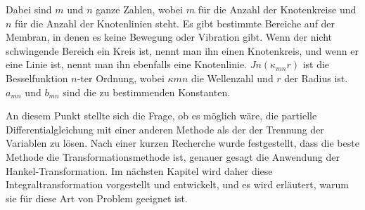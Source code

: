 Dabei sind $m$ und $n$ ganze Zahlen, wobei $m$ für die Anzahl der Knotenkreise und $n$
für die Anzahl der Knotenlinien steht. Es gibt bestimmte Bereiche auf der Membran, in denen es keine Bewegung oder Vibration gibt. Wenn der nicht schwingende Bereich ein Kreis ist, nennt man ihn einen Knotenkreis, und wenn er eine Linie ist, nennt man ihn ebenfalls eine Knotenlinie. $Jn(\kappa_{mn}r)$ ist die Besselfunktion $n$-ter Ordnung, wobei $\kappa mn$ die Wellenzahl und $r$ der Radius ist. $a_{mn}$ und $b_{mn}$ sind die zu bestimmenden Konstanten.


An diesem Punkt stellte sich die Frage, ob es möglich wäre, die partielle Differentialgleichung mit einer anderen Methode als der der Trennung der Variablen zu lösen. Nach einer kurzen Recherche wurde festgestellt, dass die beste Methode die Transformationsmethode ist, genauer gesagt die Anwendung der Hankel-Transformation. Im nächsten Kapitel wird daher diese Integraltransformation vorgestellt und entwickelt, und es wird erläutert, warum sie für diese Art von Problem geeignet ist.
